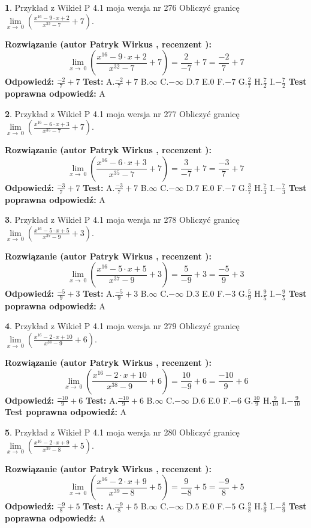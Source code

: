 \documentclass[12pt, a4paper]{article}
\theoremstyle{definition} %
\newtheorem{zad}{}
\newcommand{\zadStart}[1]{\begin{zad}#1\newline}
\newcommand{\zadStop}{\end{zad}}
\newcommand{\rozwStart}[2]{\noindent \textbf{Rozwiązanie (autor #1 , recenzent #2): }\newline}
\newcommand{\rozwStop}{\newline}
\newcommand{\odpStart}{\noindent \textbf{Odpowiedź:}\newline}
\newcommand{\odpStop}{\newline}
\newcommand{\testStart}{\noindent \textbf{Test:}\newline}
\newcommand{\testStop}{\newline}
\newcommand{\kluczStart}{\noindent \textbf{Test poprawna odpowiedź:}\newline}
\newcommand{\kluczStop}{\newline}
\begin{document}
\zadStart{Przykład z Wikieł P 4.1 moja wersja nr 276}
Obliczyć granicę $\lim\limits_{x\to\ 0}(\frac{x^{16}-9 \cdot x +2}{x^{32}-7}+7)$.
\zadStop
\rozwStart{Patryk Wirkus}{}
$$\lim\limits_{x\to\ 0}(\frac{x^{16}-9 \cdot x +2}{x^{32}-7}+7)=\frac{2}{-7}+7=\frac{-2}{7}+7$$
\rozwStop
\odpStart
$\frac{-2}{7}+7$
\odpStop
\testStart
A.$\frac{-2}{7}+7$
B.$\infty$
C.$-\infty$
D.$7$
E.$0$
F.$-7$
G.$\frac{2}{7}$
H.$\frac{7}{2}$
I.$-\frac{7}{2}$
\testStop
\kluczStart
A
\kluczStop



\zadStart{Przykład z Wikieł P 4.1 moja wersja nr 277}
Obliczyć granicę $\lim\limits_{x\to\ 0}(\frac{x^{16}-6 \cdot x +3}{x^{35}-7}+7)$.
\zadStop
\rozwStart{Patryk Wirkus}{}
$$\lim\limits_{x\to\ 0}(\frac{x^{16}-6 \cdot x +3}{x^{35}-7}+7)=\frac{3}{-7}+7=\frac{-3}{7}+7$$
\rozwStop
\odpStart
$\frac{-3}{7}+7$
\odpStop
\testStart
A.$\frac{-3}{7}+7$
B.$\infty$
C.$-\infty$
D.$7$
E.$0$
F.$-7$
G.$\frac{3}{7}$
H.$\frac{7}{3}$
I.$-\frac{7}{3}$
\testStop
\kluczStart
A
\kluczStop



\zadStart{Przykład z Wikieł P 4.1 moja wersja nr 278}
Obliczyć granicę $\lim\limits_{x\to\ 0}(\frac{x^{16}-5 \cdot x +5}{x^{37}-9}+3)$.
\zadStop
\rozwStart{Patryk Wirkus}{}
$$\lim\limits_{x\to\ 0}(\frac{x^{16}-5 \cdot x +5}{x^{37}-9}+3)=\frac{5}{-9}+3=\frac{-5}{9}+3$$
\rozwStop
\odpStart
$\frac{-5}{9}+3$
\odpStop
\testStart
A.$\frac{-5}{9}+3$
B.$\infty$
C.$-\infty$
D.$3$
E.$0$
F.$-3$
G.$\frac{5}{9}$
H.$\frac{9}{5}$
I.$-\frac{9}{5}$
\testStop
\kluczStart
A
\kluczStop



\zadStart{Przykład z Wikieł P 4.1 moja wersja nr 279}
Obliczyć granicę $\lim\limits_{x\to\ 0}(\frac{x^{16}-2 \cdot x +10}{x^{38}-9}+6)$.
\zadStop
\rozwStart{Patryk Wirkus}{}
$$\lim\limits_{x\to\ 0}(\frac{x^{16}-2 \cdot x +10}{x^{38}-9}+6)=\frac{10}{-9}+6=\frac{-10}{9}+6$$
\rozwStop
\odpStart
$\frac{-10}{9}+6$
\odpStop
\testStart
A.$\frac{-10}{9}+6$
B.$\infty$
C.$-\infty$
D.$6$
E.$0$
F.$-6$
G.$\frac{10}{9}$
H.$\frac{9}{10}$
I.$-\frac{9}{10}$
\testStop
\kluczStart
A
\kluczStop



\zadStart{Przykład z Wikieł P 4.1 moja wersja nr 280}
Obliczyć granicę $\lim\limits_{x\to\ 0}(\frac{x^{16}-2 \cdot x +9}{x^{39}-8}+5)$.
\zadStop
\rozwStart{Patryk Wirkus}{}
$$\lim\limits_{x\to\ 0}(\frac{x^{16}-2 \cdot x +9}{x^{39}-8}+5)=\frac{9}{-8}+5=\frac{-9}{8}+5$$
\rozwStop
\odpStart
$\frac{-9}{8}+5$
\odpStop
\testStart
A.$\frac{-9}{8}+5$
B.$\infty$
C.$-\infty$
D.$5$
E.$0$
F.$-5$
G.$\frac{9}{8}$
H.$\frac{8}{9}$
I.$-\frac{8}{9}$
\testStop
\kluczStart
A
\kluczStop
\end{document}
